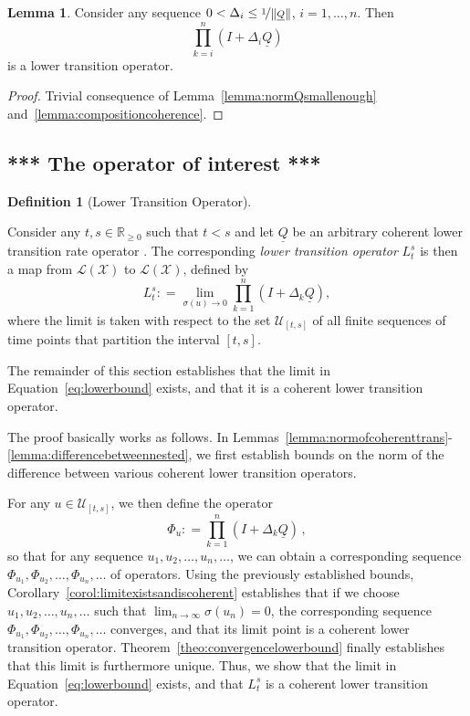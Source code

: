 \documentclass[10pt]{paper}
\theoremstyle{definition}
\newtheorem{lemma}[theorem]{Lemma}
\newtheorem{definition}{Definition}
\newcommand{\reals}{\mathbb{R}}
\newcommand{\realsnonneg}{\reals_{\geq 0}}
\newcommand{\states}{\mathcal{X}}
\newcommand{\lbound}{L}
\newcommand{\gambles}{\mathcal{L}}
\newcommand{\gamblesX}{\gambles(\states)}
\newcommand{\lrate}{\underline{Q}}
\newcommand{\norm}[1]{\left\lVert #1 \right\rVert}
\newcommand{\coloneqq}{:\!=}
\begin{document}
\begin{lemma}\label{lemma:productiscoherent}
Consider any sequence $0<\Delta_i\leq\nicefrac{1}{\norm{\lrate}}$, $i=1,\dots,n$. Then
\begin{equation*}
\prod_{k=i}^n(I+\Delta_i\lrate)
\end{equation*}
is a lower transition operator.
\end{lemma}
\begin{proof}
Trivial consequence of Lemma~\ref{lemma:normQsmallenough} and~\ref{lemma:compositioncoherence}.
\end{proof}

\subsection{*** The operator of interest ***}

\begin{definition}[Lower Transition Operator]\label{def:low_trans}

Consider any $t,s\in\realsnonneg$ such that $t<s$ and let $\lrate$ be an arbitrary coherent lower transition rate operator . The corresponding \emph{lower transition operator} $\lbound_t^s$ is then a map from $\gamblesX$ to $\gamblesX$, defined by
\begin{equation}\label{eq:lowerbound}
\lbound_t^s\coloneqq\lim_{\sigma(u)\to0}\prod_{k=1}^n(I+\Delta_k\lrate),
\end{equation}
where the limit is taken with respect to the set $\mathcal{U}_{[t,s]}$ of all finite sequences of time points that partition the interval $[t,s]$.
\end{definition}

\noindent The remainder of this section establishes that the limit in Equation~\eqref{eq:lowerbound} exists, and that it is a coherent lower transition operator.

The proof basically works as follows. In Lemmas~\ref{lemma:normofcoherenttrans}-\ref{lemma:differencebetweennested}, we first establish bounds on the norm of the difference between various coherent lower transition operators.

For any $u\in\mathcal{U}_{[t,s]}$, we then define the operator
\begin{equation*}
\Phi_u\coloneqq\prod_{k=1}^n(I+\Delta_k\lrate)\,,
\end{equation*}
so that for any sequence $u_1,u_2,\ldots,u_n,\ldots$, we can obtain a corresponding sequence $\Phi_{u_1},\Phi_{u_2},\ldots,\Phi_{u_n},\ldots$ of operators. Using the previously established bounds, Corollary~\ref{corol:limitexistsandiscoherent} establishes that if we choose $u_1,u_2,\ldots,u_n,\ldots$ such that $\lim_{n\rightarrow\infty}\sigma(u_n)=0$, the corresponding sequence $\Phi_{u_1},\Phi_{u_2},\ldots,\Phi_{u_n},\ldots$ converges, and that its limit point is a coherent lower transition operator. Theorem~\ref{theo:convergencelowerbound} finally establishes that this limit is furthermore unique. Thus, we show that the limit in Equation~\eqref{eq:lowerbound} exists, and that $L_t^s$ is a coherent lower transition operator. 
\end{document}
